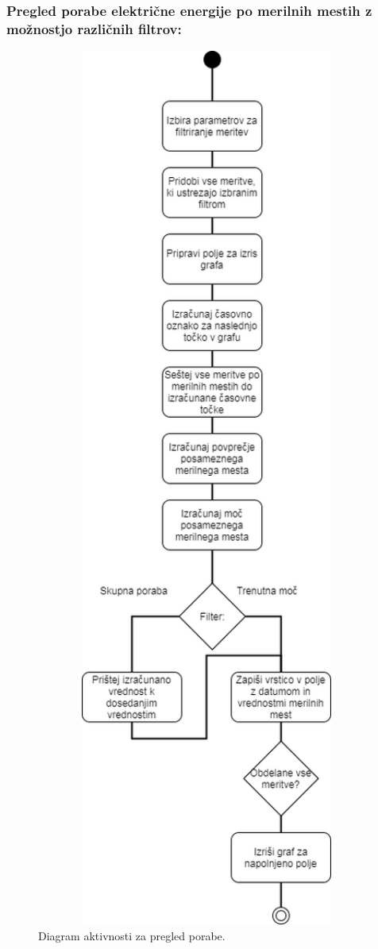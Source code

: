 \documentclass[12pt,a4paper,titlepage,openany]{report}
\begin{document}
\subsubsection{Pregled porabe električne energije po merilnih mestih z možnostjo različnih filtrov:}

\begin{figure}[H]
\begin{center}
\includegraphics[width=1\textwidth, height=0.9\textheight,keepaspectratio]{Slike/ActivityPoraba.png}
\end{center}
\caption{Diagram aktivnosti za pregled porabe.}\label{slika:ActivityPoraba}
\end{figure}
\end{document}
